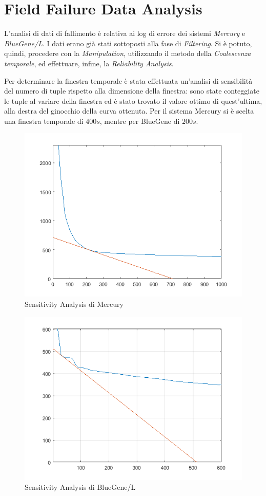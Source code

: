 \chapter{Field Failure Data Analysis}
	L'analisi di dati di fallimento è relativa ai log di errore dei sistemi \emph{Mercury} e \emph{BlueGene/L}. I dati erano già stati sottoposti alla fase di \emph{Filtering}. Si è potuto, quindi, procedere con la \emph{Manipulation}, utilizzando il metodo della \emph{Coalescenza temporale}, ed effettuare, infine, la \emph{Reliability Analysis}.\par
	Per determinare la finestra temporale è stata effettuata un'analisi di sensibilità del numero di tuple rispetto alla dimensione della finestra: sono state conteggiate le tuple al variare della finestra ed è stato trovato il valore ottimo di quest'ultima, alla destra del ginocchio della curva ottenuta. Per il sistema Mercury si è scelta una finestra temporale di $400s$, mentre per BlueGene di $200s$.
	\begin{figure}[H]
		\centering
		\includegraphics[scale=0.7]{./immagine/Mcwin.png}
		\caption{Sensitivity Analysis di Mercury}
		\label{fig:ffda-mcwin}
	\end{figure}
	\begin{figure}[H]
		\centering
		\includegraphics[scale=0.7]{./immagine/BGcwin.png}
		\caption{Sensitivity Analysis di BlueGene/L}
		\label{fig:ffda-bgcwin}
	\end{figure}
